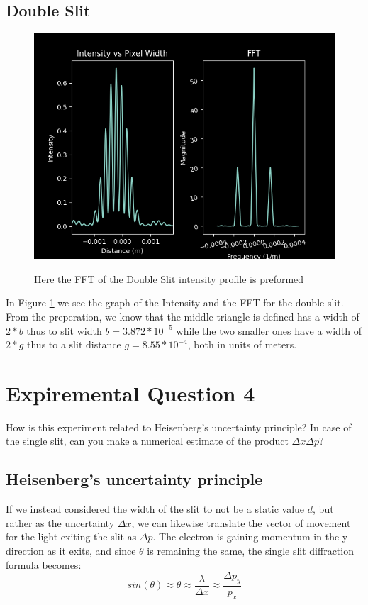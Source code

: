 \documentclass{article}
\begin{document}
\subsection{Double Slit}
\begin{figure}[h]
  \caption{Here the FFT of the Double Slit intensity profile is preformed}
  \centering
  \includegraphics[scale=0.6]{DS4_1graph.png}
  \label{doubleslit}

\end{figure}
In Figure \ref{doubleslit} we see the graph of the Intensity and the FFT for the double slit.
From the preperation, we know that the middle triangle is defined has a width of $2*b$ thus to slit width $b=3.872*10^{-5}$ while the two smaller ones have a width of $2*g$ thus to a slit distance $g=8.55*10^{-4}$, both in units of meters.

\section{Expiremental Question 4}
How is this experiment related to Heisenberg’s uncertainty principle? In case of the single slit, can you make a numerical estimate of the product $\Delta x \Delta p$?

\subsection{Heisenberg’s uncertainty principle}
If we instead considered the width of the slit to not be a static value $d$, but rather as the uncertainty $\Delta x$, we can likewise translate the vector of movement for the light exiting the slit as $ \Delta p$. The electron is gaining momentum in the y direction as it exits, and since $\theta $ is remaining the same,  the single slit diffraction formula becomes: $$sin(\theta) \approx \theta \approx \frac{\lambda}{\Delta x} \approx \frac{\Delta p_y }{p_x}$$
\end{document}
